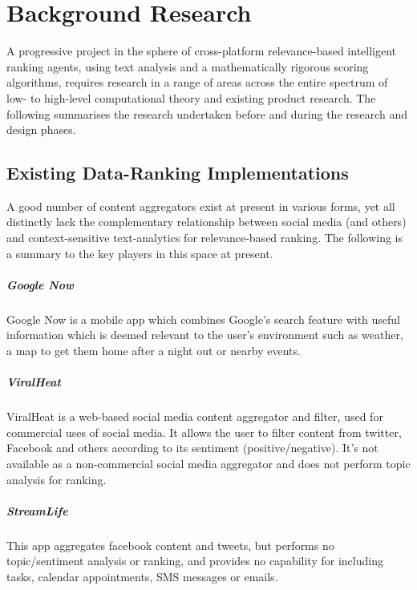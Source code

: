 \chapter{Background Research}

A progressive project in the sphere of cross-platform relevance-based intelligent ranking agents, using text analysis and a mathematically rigorous scoring algorithms, requires research in a range of areas across the entire spectrum of low- to high-level computational theory and existing product research. The following summarises the research undertaken before and during the research and design phases.

\section{Existing Data-Ranking Implementations}

A good number of content aggregators exist at present in various forms, yet all distinctly lack the complementary relationship between social media (and others) and context-sensitive text-analytics for relevance-based ranking. The following is a summary to the key players in this space at present.

\paragraph{Google Now}
Google Now is a mobile app which combines Google's search feature with useful information which is deemed relevant to the user's environment such as weather, a map to get them home after a night out or nearby events.

\paragraph{ViralHeat}
ViralHeat is a web-based social media content aggregator and filter, used for commercial uses of social media. It allows the user to filter content from twitter, Facebook and others according to its sentiment (positive/negative). It's not available as a non-commercial social media aggregator and does not perform topic analysis for ranking.

\paragraph{StreamLife}
This app aggregates facebook content and tweets, but performs no topic/sentiment analysis or ranking, and provides no capability for including tasks, calendar appointments, SMS messages or emails.


